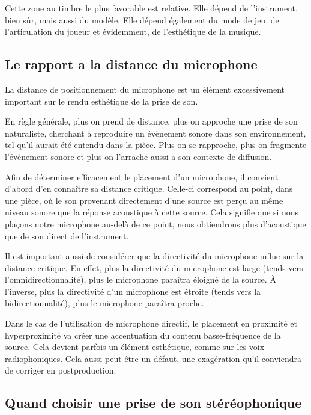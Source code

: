 \documentclass[
]{book}
\begin{document}
Cette zone au timbre le plus favorable est relative. Elle dépend de l'instrument, bien sûr, mais aussi du modèle. Elle dépend également du mode de jeu, de l'articulation du joueur et évidemment, de l'esthétique de la musique.

\hypertarget{le-rapport-a-la-distance-du-microphone}{%
\subsection{Le rapport a la distance du microphone}\label{le-rapport-a-la-distance-du-microphone}}

La distance de positionnement du microphone est un élément excessivement important sur le rendu esthétique de la prise de son.

En règle générale, plus on prend de distance, plus on approche une prise de son naturaliste, cherchant à reproduire un évènement sonore dans son environnement, tel qu'il aurait été entendu dans la pièce. Plus on se rapproche, plus on fragmente l'événement sonore et plus on l'arrache aussi a son contexte de diffusion.

Afin de déterminer efficacement le placement d'un microphone, il convient d'abord d'en connaître sa distance critique. Celle-ci correspond au point, dans une pièce, où le son provenant directement d'une source est perçu au même niveau sonore que la réponse acoustique à cette source. Cela signifie que si nous plaçons notre microphone au-delà de ce point, nous obtiendrons plus d'acoustique que de son direct de l'instrument.

Il est important aussi de considérer que la directivité du microphone influe sur la distance critique. En effet, plus la directivité du microphone est large (tends vers l'omnidirectionnalité), plus le microphone paraîtra éloigné de la source. À l'inverse, plus la directivité d'un microphone est étroite (tends vers la bidirectionnalité), plus le microphone paraîtra proche.

Dans le cas de l'utilisation de microphone directif, le placement en proximité et hyperproximité va créer une accentuation du contenu basse-fréquence de la source. Cela devient parfois un élément esthétique, comme sur les voix radiophoniques. Cela aussi peut être un défaut, une exagération qu'il conviendra de corriger en postproduction.

\hypertarget{quand-choisir-une-prise-de-son-stuxe9ruxe9ophonique}{%
\subsection{Quand choisir une prise de son stéréophonique}\label{quand-choisir-une-prise-de-son-stuxe9ruxe9ophonique}}
\end{document}

